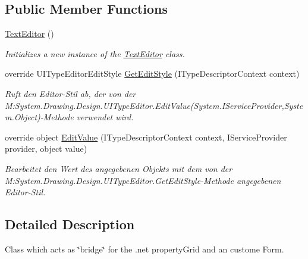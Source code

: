 \subsection*{Public Member Functions}
\begin{DoxyCompactItemize}
\item 
\hyperlink{class_a_rdev_kit_1_1_view_1_1_text_editor_af723a406320d4f8d9fc43bad1be1f15e}{Text\-Editor} ()
\begin{DoxyCompactList}\small\item\em Initializes a new instance of the \hyperlink{class_a_rdev_kit_1_1_view_1_1_text_editor}{Text\-Editor} class. \end{DoxyCompactList}\item 
override U\-I\-Type\-Editor\-Edit\-Style \hyperlink{class_a_rdev_kit_1_1_view_1_1_text_editor_adba47e5f16836644bbcaa7922b43292a}{Get\-Edit\-Style} (I\-Type\-Descriptor\-Context context)
\begin{DoxyCompactList}\small\item\em Ruft den Editor-\/\-Stil ab, der von der M\-:\-System.\-Drawing.\-Design.\-U\-I\-Type\-Editor.\-Edit\-Value(\-System.\-I\-Service\-Provider,\-System.\-Object)-\/\-Methode verwendet wird. \end{DoxyCompactList}\item 
override object \hyperlink{class_a_rdev_kit_1_1_view_1_1_text_editor_a98a217827499a0bd393abef747bd4c26}{Edit\-Value} (I\-Type\-Descriptor\-Context context, I\-Service\-Provider provider, object value)
\begin{DoxyCompactList}\small\item\em Bearbeitet den Wert des angegebenen Objekts mit dem von der M\-:\-System.\-Drawing.\-Design.\-U\-I\-Type\-Editor.\-Get\-Edit\-Style-\/\-Methode angegebenen Editor-\/\-Stil. \end{DoxyCompactList}\end{DoxyCompactItemize}


\subsection{Detailed Description}
Class which acts as \char`\"{}bridge\char`\"{} for the .net property\-Grid and an custome Form. 



